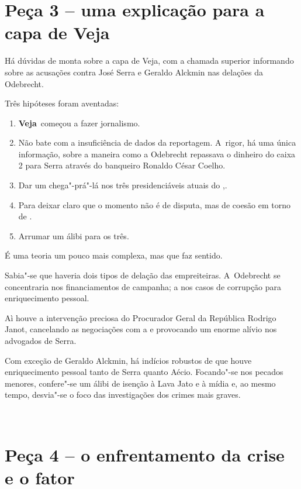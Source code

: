 \section{Peça 3 -- uma explicação para a capa de Veja}

Há dúvidas de monta sobre a capa de Veja, com a chamada superior
informando sobre as acusações contra José Serra e Geraldo Alckmin nas
delações da Odebrecht.

Três hipóteses foram aventadas:

\begin{enumerate}
\itemsep1pt\parskip0pt
\item
  \textbf{Veja}~começou a fazer jornalismo.
\item
  Não bate com a insuficiência de dados da reportagem. A~rigor, há uma
  única informação, sobre a maneira como a Odebrecht repassava o
  dinheiro do caixa 2 para Serra através do banqueiro Ronaldo César
  Coelho.
\item
  Dar um chega"-prá"-lá nos três presidenciáveis atuais do ,.
\item
  Para deixar claro que o momento não é de disputa, mas de coesão em
  torno de .
\item
  Arrumar um álibi para os três.
\end{enumerate}

É uma teoria um pouco mais complexa, mas que faz sentido.

Sabia"-se que haveria dois tipos de delação das empreiteiras. A~Odebrecht
se concentraria nos financiamentos de campanha; a  nos casos de
corrupção para enriquecimento pessoal.

Aì houve a intervenção preciosa do Procurador Geral da República Rodrigo
Janot, cancelando as negociações com a  e provocando um enorme alívio
nos advogados de Serra.

Com exceção de Geraldo Alckmin, há indícios robustos de que houve
enriquecimento pessoal tanto de Serra quanto Aécio. Focando"-se nos
pecados menores, confere"-se um álibi de isenção à Lava Jato e à mídia e,
ao mesmo tempo, desvia"-se o foco das investigações dos crimes mais
graves.

\begin{center}~\end{center}


\section{Peça 4 -- o enfrentamento da crise e o fator }

